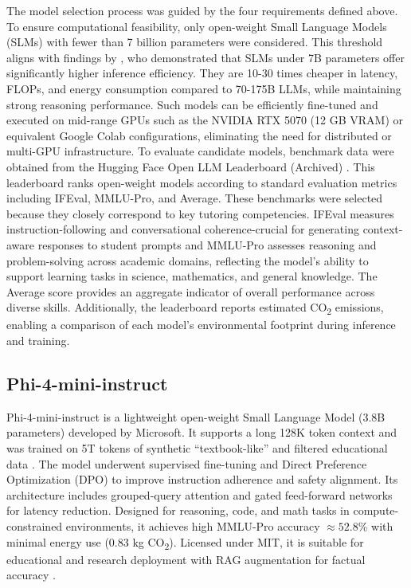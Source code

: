The model selection process was guided by the four requirements defined above. To ensure computational feasibility, only open-weight Small Language Models (SLMs) with fewer than 7 billion parameters were considered. This threshold aligns with findings by \textcite{vSmallLan73:online}, who demonstrated that SLMs under 7B parameters offer significantly higher inference efficiency. They are 10-30 times cheaper in latency, FLOPs, and energy consumption compared to 70-175B LLMs, while maintaining strong reasoning performance. Such models can be efficiently fine-tuned and executed on mid-range GPUs such as the NVIDIA RTX 5070  (12 GB VRAM) or equivalent Google Colab configurations, eliminating the need for distributed or multi-GPU infrastructure. To evaluate candidate models, benchmark data were obtained from the Hugging Face Open LLM Leaderboard (Archived) \parencite{HuggingFaceLeaderboard2025}. This leaderboard ranks open-weight models according to standard evaluation metrics including IFEval, MMLU-Pro, and Average. These benchmarks were selected because they closely correspond to key tutoring competencies. IFEval measures instruction-following and conversational coherence-crucial for generating context-aware responses to student prompts and MMLU-Pro assesses reasoning and problem-solving across academic domains, reflecting the model’s ability to support learning tasks in science, mathematics, and general knowledge. The Average score provides an aggregate indicator of overall performance across diverse skills. Additionally, the leaderboard reports estimated CO\textsubscript{2} emissions, enabling a comparison of each model’s environmental footprint during inference and training.

\subsection{Phi-4-mini-instruct}
Phi-4-mini-instruct is a lightweight open-weight Small Language Model (3.8B parameters) developed by Microsoft. It supports a long 128K token context and was trained on 5T tokens of synthetic “textbook-like” and filtered educational data \parencite{microsof61:online,Empoweri69:online}. The model underwent supervised fine-tuning and Direct Preference Optimization (DPO) to improve instruction adherence and safety alignment. Its architecture includes grouped-query attention and gated feed-forward networks for latency reduction. Designed for reasoning, code, and math tasks in compute-constrained environments, it achieves high MMLU-Pro accuracy \(\approx 52.8\)\% with minimal energy use (0.83 kg CO\textsubscript{2}). Licensed under MIT, it is suitable for educational and research deployment with RAG augmentation for factual accuracy \parencite{microsof61:online}.

